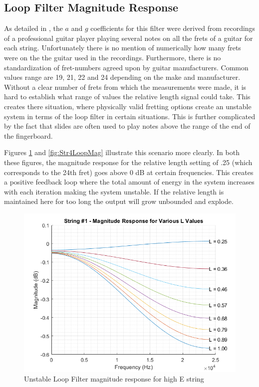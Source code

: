 \documentclass[../main.tex]{subfiles}
\begin{document}
\subsection{Loop Filter Magnitude Response}
As detailed in , the $a$ and $g$ coefficients for this filter were derived from recordings of a professional guitar player playing several notes on all the frets of a guitar for each string. Unfortunately there is no mention of numerically how many frets were on the the guitar used in the recordings. Furthermore, there is no standardization of fret-numbers agreed upon by guitar manufacturers. Common values range are 19, 21, 22 and 24 depending on the make and manufacturer. Without a clear number of frets from which the measurements were made, it is hard to establish what range of values the relative length signal could take. This creates there situation, where physically valid fretting options create an unstable system in terms of the loop filter in certain situations. This is further complicated by the fact that slides are often used to play notes above the range of the end of the fingerboard.

Figures \ref{fig:Str1LoopMag} and \ref{fig:Str4LoopMag} illustrate this scenario more clearly. In both these figures, the magnitude response for the relative length setting of .25 (which corresponds to the 24th fret) goes above 0 dB at certain frequencies. This creates a positive feedback loop where the total amount of energy in the system increases with each iteration making the system unstable. If the relative length is maintained here for too long the output will grow unbounded and explode.

\begin{figure}[h]
    \centering
    \includegraphics[scale=.65]{./images/plots/String 1 - Loop Filter Magnitude Response.png}
    \caption{Unstable Loop Filter magnitude response for high E string}
    \label{fig:Str1LoopMag}
\end{figure}
\end{document}
